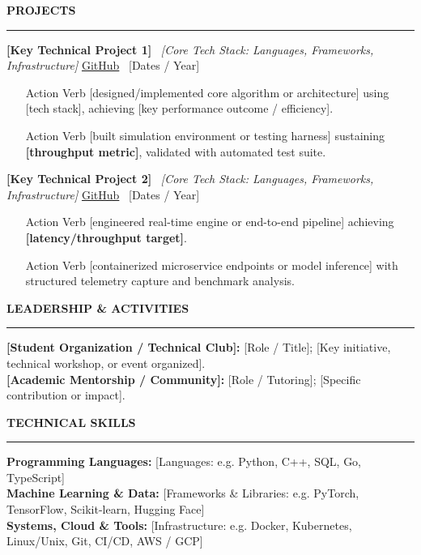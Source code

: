 \documentclass[10pt,letterpaper]{article}
\newcommand{\cvsection}[1]{%
  \vspace{3.5pt}%
  {\small\textbf{\MakeUppercase{#1}}}\\[-3.5pt]%
  \rule{\textwidth}{0.4pt}\par\vspace{2pt}%
}
\begin{document}
\cvsection{Projects}

\textbf{[Key Technical Project 1]} \textbar\ \textit{[Core Tech Stack: Languages, Frameworks, Infrastructure]} \hfill \href{https://github.com/username/project-repo}{\small GitHub} \textbullet\ [Dates / Year]
\begin{itemize}
    \item [Action Verb] [designed/implemented core algorithm or architecture] using [tech stack], achieving [key performance outcome / efficiency].
    \item [Action Verb] [built simulation environment or testing harness] sustaining \textbf{[throughput metric]}, validated with automated test suite.
\end{itemize}

\vspace{2pt}
\textbf{[Key Technical Project 2]} \textbar\ \textit{[Core Tech Stack: Languages, Frameworks, Infrastructure]} \hfill \href{https://github.com/username/project-repo}{\small GitHub} \textbullet\ [Dates / Year]
\begin{itemize}
    \item [Action Verb] [engineered real-time engine or end-to-end pipeline] achieving \textbf{[latency/throughput target]}.
    \item [Action Verb] [containerized microservice endpoints or model inference] with structured telemetry capture and benchmark analysis.
\end{itemize}

\cvsection{Leadership \& Activities}
\textbf{[Student Organization / Technical Club]:} [Role / Title]; [Key initiative, technical workshop, or event organized].\\
\textbf{[Academic Mentorship / Community]:} [Role / Tutoring]; [Specific contribution or impact].

\cvsection{Technical Skills}
\textbf{Programming Languages:} [Languages: e.g. Python, C++, SQL, Go, TypeScript]\\
\textbf{Machine Learning \& Data:} [Frameworks \& Libraries: e.g. PyTorch, TensorFlow, Scikit-learn, Hugging Face]\\
\textbf{Systems, Cloud \& Tools:} [Infrastructure: e.g. Docker, Kubernetes, Linux/Unix, Git, CI/CD, AWS / GCP]
\end{document}
